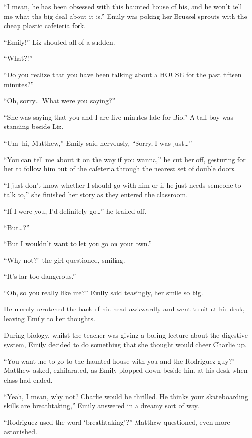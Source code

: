 “I mean, he has been obsessed with this haunted house of his, and he won’t tell me what the big deal about it is.” Emily was poking her Brussel sprouts with the cheap plastic cafeteria fork.

“Emily!” Liz shouted all of a sudden.

“What?!”

“Do you realize that you have been talking about a HOUSE for the past fifteen minutes?”

“Oh, sorry… What were you saying?”

“She was saying that you and I are five minutes late for Bio.” A tall boy was standing beside Liz.

“Um, hi, Matthew,” Emily said nervously, “Sorry, I was just…”

“You can tell me about it on the way if you wanna,” he cut her off, gesturing for her to follow him out of the cafeteria through the nearest set of double doors.

\bigskip

“I just don’t know whether I should go with him or if he just needs someone to talk to,” she finished her story as they entered the classroom.

“If I were you, I’d definitely go…” he trailed off.

“But…?”

“But I wouldn’t want to let you go on your own.”

“Why not?” the girl questioned, smiling.

“It’s far too dangerous.”

“Oh, so you really like me?” Emily said teasingly, her smile so big.

He merely scratched the back of his head awkwardly and went to sit at his desk, leaving Emily to her thoughts.

During biology, whilst the teacher was giving a boring lecture about the digestive system, Emily decided to do something that she thought would cheer Charlie up.

\bigskip

“You want me to go to the haunted house with you and the Rodriguez guy?” Matthew asked, exhilarated, as Emily plopped down beside him at his desk when class had ended.

“Yeah, I mean, why not? Charlie would be thrilled. He thinks your skateboarding skills are breathtaking,” Emily answered in a dreamy sort of way.

“Rodriguez used the word ‘breathtaking’?” Matthew questioned, even more astonished.

